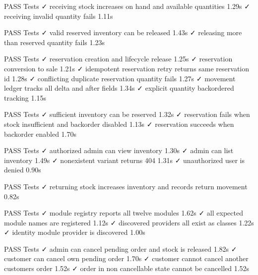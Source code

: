    PASS  Tests\Feature\InventoryReceiveStockTest
  ✓ receiving stock increases on hand and available quantities           1.29s  
  ✓ receiving invalid quantity fails                                     1.11s  

   PASS  Tests\Feature\InventoryReleaseTest
  ✓ valid reserved inventory can be released                             1.43s  
  ✓ releasing more than reserved quantity fails                          1.23s  

   PASS  Tests\Feature\InventoryReservationLifecycleTest
  ✓ reservation creation and lifecycle release                           1.25s  
  ✓ reservation conversion to sale                                       1.21s  
  ✓ idempotent reservation retry returns same reservation id             1.28s  
  ✓ conflicting duplicate reservation quantity fails                     1.27s  
  ✓ movement ledger tracks all delta and after fields                    1.34s  
  ✓ explicit quantity backordered tracking                               1.15s  

   PASS  Tests\Feature\InventoryReservationTest
  ✓ sufficient inventory can be reserved                                 1.32s  
  ✓ reservation fails when stock insufficient and backorder disabled     1.13s  
  ✓ reservation succeeds when backorder enabled                          1.70s  

   PASS  Tests\Feature\InventoryRetrievalTest
  ✓ authorized admin can view inventory                                  1.30s  
  ✓ admin can list inventory                                             1.49s  
  ✓ nonexistent variant returns 404                                      1.31s  
  ✓ unauthorized user is denied                                          0.90s  

   PASS  Tests\Feature\InventoryReturnTest
  ✓ returning stock increases inventory and records return movement      0.82s  

   PASS  Tests\Feature\ModuleRegistrationTest
  ✓ module registry reports all twelve modules                           1.62s  
  ✓ all expected module names are registered                             1.12s  
  ✓ discovered providers all exist as classes                            1.22s  
  ✓ identity module provider is discovered                               1.00s  

   PASS  Tests\Feature\OrderCancellationTest
  ✓ admin can cancel pending order and stock is released                 1.82s  
  ✓ customer can cancel own pending order                                1.70s  
  ✓ customer cannot cancel another customers order                       1.52s  
  ✓ order in non cancellable state cannot be cancelled                   1.52s  

